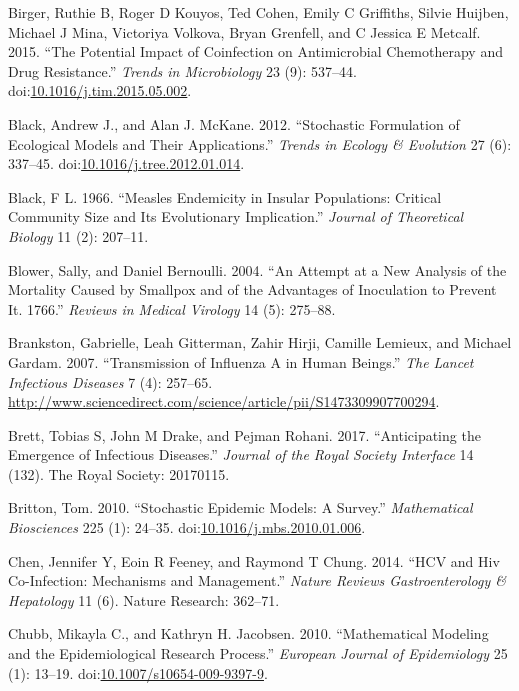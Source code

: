 \documentclass[]{article}
\theoremstyle{definition}
\theoremstyle{definition}
\theoremstyle{definition}
\theoremstyle{remark}
\begin{document}
\hypertarget{ref-birger15}{}
Birger, Ruthie B, Roger D Kouyos, Ted Cohen, Emily C Griffiths, Silvie
Huijben, Michael J Mina, Victoriya Volkova, Bryan Grenfell, and C
Jessica E Metcalf. 2015. ``The Potential Impact of Coinfection on
Antimicrobial Chemotherapy and Drug Resistance.'' \emph{Trends in
Microbiology} 23 (9): 537--44.
doi:\href{https://doi.org/10.1016/j.tim.2015.05.002}{10.1016/j.tim.2015.05.002}.

\hypertarget{ref-black12}{}
Black, Andrew J., and Alan J. McKane. 2012. ``Stochastic Formulation of
Ecological Models and Their Applications.'' \emph{Trends in Ecology \&
Evolution} 27 (6): 337--45.
doi:\href{https://doi.org/10.1016/j.tree.2012.01.014}{10.1016/j.tree.2012.01.014}.

\hypertarget{ref-black66}{}
Black, F L. 1966. ``Measles Endemicity in Insular Populations: Critical
Community Size and Its Evolutionary Implication.'' \emph{Journal of
Theoretical Biology} 11 (2): 207--11.

\hypertarget{ref-blower04}{}
Blower, Sally, and Daniel Bernoulli. 2004. ``An Attempt at a New
Analysis of the Mortality Caused by Smallpox and of the Advantages of
Inoculation to Prevent It. 1766.'' \emph{Reviews in Medical Virology} 14
(5): 275--88.

\hypertarget{ref-brankston07}{}
Brankston, Gabrielle, Leah Gitterman, Zahir Hirji, Camille Lemieux, and
Michael Gardam. 2007. ``Transmission of Influenza A in Human Beings.''
\emph{The Lancet Infectious Diseases} 7 (4): 257--65.
\url{http://www.sciencedirect.com/science/article/pii/S1473309907700294}.

\hypertarget{ref-brett17}{}
Brett, Tobias S, John M Drake, and Pejman Rohani. 2017. ``Anticipating
the Emergence of Infectious Diseases.'' \emph{Journal of the Royal
Society Interface} 14 (132). The Royal Society: 20170115.

\hypertarget{ref-britton10a}{}
Britton, Tom. 2010. ``Stochastic Epidemic Models: A Survey.''
\emph{Mathematical Biosciences} 225 (1): 24--35.
doi:\href{https://doi.org/10.1016/j.mbs.2010.01.006}{10.1016/j.mbs.2010.01.006}.

\hypertarget{ref-chen14}{}
Chen, Jennifer Y, Eoin R Feeney, and Raymond T Chung. 2014. ``HCV and
Hiv Co-Infection: Mechanisms and Management.'' \emph{Nature Reviews
Gastroenterology \& Hepatology} 11 (6). Nature Research: 362--71.

\hypertarget{ref-chubb10}{}
Chubb, Mikayla C., and Kathryn H. Jacobsen. 2010. ``Mathematical
Modeling and the Epidemiological Research Process.'' \emph{European
Journal of Epidemiology} 25 (1): 13--19.
doi:\href{https://doi.org/10.1007/s10654-009-9397-9}{10.1007/s10654-009-9397-9}.
\end{document}
